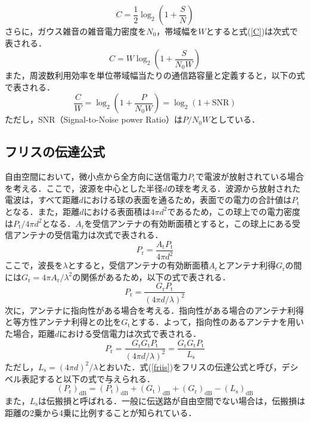 \documentclass[master]{kuisthesis}		%
\begin{document}
\begin{equation}
\label{C}
C = \frac{1}{2}\log_2 \left(1 + \frac{S}{N}\right)
\end{equation}
さらに，ガウス雑音の雑音電力密度を$N_0$，帯域幅を$W$とすると式(\ref{C})は次式で表される．
\begin{equation}
C = W\log_2 \left(1 + \frac{S}{N_0W}\right)
\end{equation}
また，周波数利用効率を単位帯域幅当たりの通信路容量と定義すると，以下の式で表される．
\begin{equation}
\label{SNR}
\frac{C}{W} = \log_2 \left(1 + \frac{P}{N_0W}\right) = \log_2 (1 + \mathrm{SNR})
\end{equation}
ただし，SNR（Signal-to-Noise power Ratio）は$P/N_0W$としている．

\subsection{フリスの伝達公式}
\label{Friis}
自由空間において，微小点から全方向に送信電力$P_\mathrm{t}$で電波が放射されている場合を考える．ここで，波源を中心とした半径$d$の球を考える．波源から放射された電波は，すべて距離$d$における球の表面を通るため，表面での電力の合計値は$P_\mathrm{t}$となる．また，距離$d$における表面積は$4\pi d^2$であるため，この球上での電力密度は$P_\mathrm{t}/4\pi d^2$となる．$A_\mathrm{r}$を受信アンテナの有効断面積とすると，この球上にある受信アンテナの受信電力は次式で表される．
\begin{equation}
P_\mathrm{r} = \frac{A_\mathrm{t}P_\mathrm{t}}{4\pi d^2} 
\end{equation}
ここで，波長を$\lambda$とすると，受信アンテナの有効断面積$A_\mathrm{r}$とアンテナ利得$G_\mathrm{r}$の間には$G_\mathrm{r} = 4\pi A_\mathrm{r}/\lambda^2$の関係があるため，以下の式で表される．
\begin{equation}
P_\mathrm{r} = \frac{G_\mathrm{r}P_\mathrm{t}}{(4\pi d/\lambda)^2} 
\end{equation}
次に，アンテナに指向性がある場合を考える．指向性がある場合のアンテナ利得と等方性アンテナ利得との比を$G_\mathrm{t}$とする．よって，指向性のあるアンテナを用いた場合，距離$d$における受信電力は次式で表される．
\begin{equation}
\label{friis}
P_\mathrm{r} = \frac{G_\mathrm{r}G_\mathrm{t}P_\mathrm{t}}{(4\pi d/\lambda)^2} = \frac{G_\mathrm{r}G_\mathrm{t}P_\mathrm{t}}{L_\mathrm{s}}
\end{equation}
ただし，$L_\mathrm{s} = (4\pi d)^2/\lambda$とおいた．式(\ref{friis})をフリスの伝達公式と呼び，デシベル表記すると以下の式で与えられる．
\begin{equation}
\label{friis_1}
(P_\mathrm{r})_{\mathrm{dB}} = (P_\mathrm{t})_{\mathrm{dB}} + (G_\mathrm{t})_{\mathrm{dB}} + (G_\mathrm{r})_{\mathrm{dB}} - (L_\mathrm{s})_{\mathrm{dB}}
\end{equation}
また，$L_\mathrm{s}$は伝搬損と呼ばれる．一般に伝送路が自由空間でない場合は，伝搬損は距離の2乗から4乗に比例することが知られている．
\end{document}
